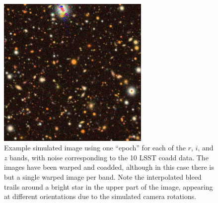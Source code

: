 \documentclass[twocolumn,twocolappendix,astrosym]{openjournal}
\begin{document}
\begin{figure}
    \begin{center}
    \includegraphics[width=0.65\textwidth]{example-image.jpg}
    \caption{
        Example simulated image using one ``epoch'' for each of the $r$, $i$,
        and $z$ bands, with noise corresponding to the 10 LSST coadd data.
        The images have been warped and coadded, although in this case there
        is but a single warped image per band.
        Note the interpolated bleed trails around a bright star in the upper
        part of the image, appearing at different orientations due to the
        simulated camera rotations.
    } \label{fig:colorimage}
    \end{center}
\end{figure}
\end{document}
